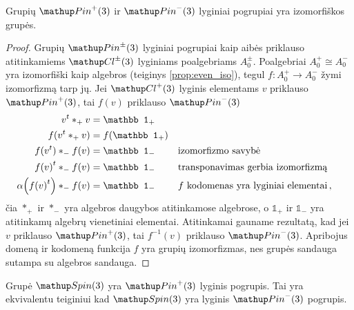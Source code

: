 \begin{proposition}
	Grupių $\pinp$ ir $\pinm$ lyginiai pogrupiai 
	yra izomorfiškos grupės.
\end{proposition}
\begin{proof}
	Grupių $\pinpm$ lyginiai pogrupiai kaip aibės priklauso 
	atitinkamiems $\Clpm$ lyginiams poalgebriams $A_0^\pm$.
	Poalgebriai $A_0^+ \cong A_0^-$ yra izomorfiški kaip algebros (teiginys \ref{prop:even_iso}),
	tegul $f: A_0^+ \to A_0^-$ žymi izomorfizmą tarp jų.
	Jei $\Clp$ lyginis elementams $v$ priklauso $\pinp$,
	tai $f(v)$ priklauso $\pinm$
	\begin{equation}
		\begin{aligned}
			v^t *_+ v &= \mathbb 1_+
			\\
			f(v^t *_+ v ) &= f\qty(\mathbb 1_+)
			\\
			f( v^t) *_- f(v) &= \mathbb 1_-
			&& \text{izomorfizmo savybė}\\
			{f(v)}^t *_- f(v) &= \mathbb 1_-
			&& \text{transponavimas gerbia izomorfizmą}\\
			\alpha\qty({f(v)}^t) *_- f(v) &= \mathbb 1_-
			&& f \text{ kodomenas yra lyginiai elementai}
			\,,
		\end{aligned}
	\end{equation}
	čia $*_+$ ir $*_-$ yra algebros daugybos atitinkamose algebrose,
	o $\mathbb 1_+$ ir $\mathbb 1_-$ yra 
	atitinkamų algebrų vienetiniai elementai.
	Atitinkamai gauname rezultatą, kad jei $v$ priklauso $\pinp$,
	tai $f^{-1}(v)$ priklauso $\pinm$.
	Apribojus domeną ir kodomeną funkcija $f$ yra
	grupių izomorfizmas, nes grupės sandauga
	sutampa su algebros sandauga.
\end{proof}

\begin{definition}
	Grupė $\spin$ yra $\pinp$ lyginis pogrupis.
	Tai yra ekvivalentu teiginiui kad $\spin$ yra lyginis $\pinm$ pogrupis.
\end{definition}

